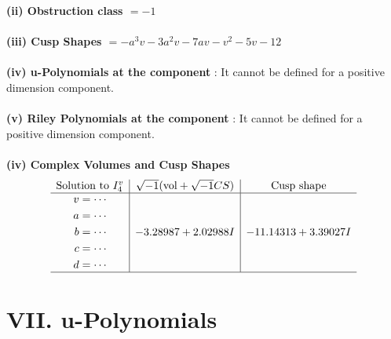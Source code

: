 \documentclass[1p]{elsarticle_modified}
\theoremstyle{definition}
\newcommand{\I}{\sqrt{-1}}
\begin{document}
\flushleft \textbf{(ii) Obstruction class $= -1$}\\~\\
\flushleft \textbf{(iii) Cusp Shapes $= - a^3 v-3 a^2 v-7 a v- v^2-5 v-12$}\\~\\
\flushleft \textbf{(iv) u-Polynomials at the component} : It cannot be defined for a positive dimension component.\\~\\
\flushleft \textbf{(v) Riley Polynomials at the component} : It cannot be defined for a positive dimension component.\\~\\
\newpage\flushleft \textbf{(iv) Complex Volumes and Cusp Shapes}
$$\begin{array}{c|c|c} 
\text{Solution to }I^v_{4}& \I (\text{vol} + \sqrt{-1}CS) & \text{Cusp shape}\\
 \hline 
\begin{aligned}
v &= \cdots \\
a &= \cdots \\
b &= \cdots \\
c &= \cdots \\
d &= \cdots\end{aligned}
 & -3.28987 + 2.02988 I & -11.14313 + 3.39027 I\\
 \hline 
 \end{array}
$$
\newpage\renewcommand{\arraystretch}{1}
\centering \section*{ VII. u-Polynomials}
\end{document}
